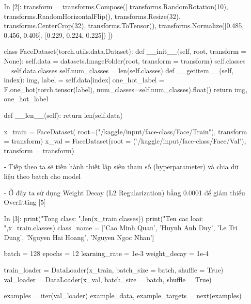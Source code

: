 \documentclass[12pt, a4paper]{article}
\begin{document}
\begin{python}
In [2]: transform = transforms.Compose([
                transforms.RandomRotation(10),      
                transforms.RandomHorizontalFlip(),  
                transforms.Resize(32),             
                transforms.CenterCrop(32),         
                transforms.ToTensor(),
                transforms.Normalize([0.485, 0.456, 0.406],
                                     [0.229, 0.224, 0.225])
        ])
        
        class FaceDataset(torch.utils.data.Dataset):
            def __init__(self, root, transform = None):
                self.data = datasets.ImageFolder(root, transform = transform)
                self.classes = self.data.classes
                self.num_classes = len(self.classes)
            def __getitem__(self, index):
                img, label = self.data[index]
                one_hot_label = F.one_hot(torch.tensor(label), num_classes=self.num_classes).float()
                return img, one_hot_label   
            
            def __len__(self):
                    return len(self.data)
                
                
        x_train = FaceDataset( root=("/kaggle/input/face-class/Face/Train"), transform = transform)
        x_val = FaceDataset(root = ('/kaggle/input/face-class/Face/Val'), transform = transform)
\end{python}

\par - Tiếp theo ta sẽ tiến hành thiết lập siêu tham số (hyperparameter) và chia dữ liệu theo batch
cho model
\par - Ở đây ta sử dụng Weight Decay (L2 Regularization) bằng 0.0001 để giảm thiểu Overfitting [5]
\begin{python}
In [3]: print("Tong class: ",len(x_train.classes))
        print("Ten cac loai: ",x_train.classes)
        class_name = ['Cao Minh Quan', 'Huynh Anh Duy', 'Le Tri Dung', 'Nguyen Hai Hoang', 'Nguyen Ngoc Nhan']
        
        batch = 128
        epochs = 12
        learning_rate = 1e-3
        weight_decay = 1e-4
        
        train_loader = DataLoader(x_train, batch_size = batch, shuffle = True)
        val_loader = DataLoader(x_val, batch_size = batch, shuffle = True)
        
        examples = iter(val_loader)
        example_data, example_targets = next(examples)
\end{python}
\end{document}
